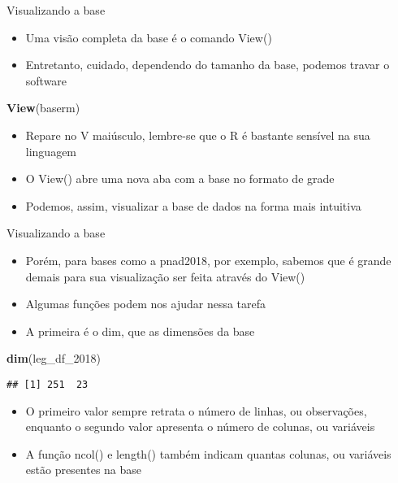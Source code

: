 \documentclass[
  10pt,
  ignorenonframetext,
]{beamer}
\newenvironment{Shaded}{\begin{snugshade}}{\end{snugshade}}
\newcommand{\DecValTok}[1]{\textcolor[rgb]{0.00,0.00,0.81}{#1}}
\newcommand{\KeywordTok}[1]{\textcolor[rgb]{0.13,0.29,0.53}{\textbf{#1}}}
\newcommand{\NormalTok}[1]{#1}
\providecommand{\tightlist}{%
  \setlength{\itemsep}{0pt}\setlength{\parskip}{0pt}}
\begin{document}
\begin{frame}[fragile]{Visualizando a base}
\protect\hypertarget{visualizando-a-base-1}{}
\begin{itemize}
\tightlist
\item
  Uma visão completa da base é o comando View()
\item
  Entretanto, cuidado, dependendo do tamanho da base, podemos travar o
  software
\end{itemize}

\begin{Shaded}
\begin{Highlighting}[]
\KeywordTok{View}\NormalTok{(baserm)}
\end{Highlighting}
\end{Shaded}

\begin{itemize}
\tightlist
\item
  Repare no V maiúsculo, lembre-se que o R é bastante sensível na sua
  linguagem
\item
  O View() abre uma nova aba com a base no formato de grade
\item
  Podemos, assim, visualizar a base de dados na forma mais intuitiva
\end{itemize}
\end{frame}

\begin{frame}[fragile]{Visualizando a base}
\protect\hypertarget{visualizando-a-base-2}{}
\begin{itemize}
\tightlist
\item
  Porém, para bases como a pnad2018, por exemplo, sabemos que é grande
  demais para sua visualização ser feita através do View()
\item
  Algumas funções podem nos ajudar nessa tarefa
\item
  A primeira é o dim, que as dimensões da base
\end{itemize}

\begin{Shaded}
\begin{Highlighting}[]
\KeywordTok{dim}\NormalTok{(leg\_df\_}\DecValTok{2018}\NormalTok{)}
\end{Highlighting}
\end{Shaded}

\begin{verbatim}
## [1] 251  23
\end{verbatim}

\begin{itemize}
\tightlist
\item
  O primeiro valor sempre retrata o número de linhas, ou observações,
  enquanto o segundo valor apresenta o número de colunas, ou variáveis
\item
  A função ncol() e length() também indicam quantas colunas, ou
  variáveis estão presentes na base
\end{itemize}
\end{frame}
\end{document}
